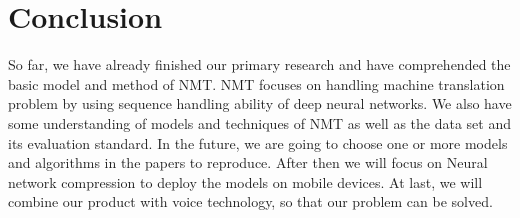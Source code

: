 \documentclass[a4paper, 12pt]{article}
\begin{document}
\section{Conclusion}
So far, we have already finished our primary research and have comprehended the basic model and method of NMT. NMT focuses on handling machine translation problem by using sequence handling ability of deep neural networks. We also have some understanding of models and techniques of NMT as well as the data set and its evaluation standard. In the future, we are going to choose one or more models and algorithms in the papers to reproduce. After then we will focus on Neural network compression to deploy the models on mobile devices. At last, we will combine our product with voice technology, so that our problem can be solved.

\appendix



\newpage


\end{document}
